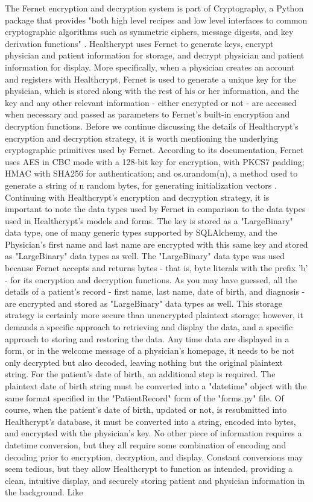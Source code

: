 \documentclass[letterpaper, 10pt,DIV=13]{scrartcl}
\begin{document}
\begin{multicols}{2}
\begin{spacing}{1.25}
The Fernet encryption and decryption system is part of Cryptography, a Python package that provides "both high level recipes and low level interfaces to common cryptographic algorithms such as symmetric ciphers, message digests, and key derivation functions" \cite{Cryptography-Docs}. Healthcrypt uses Fernet to generate keys, encrypt physician and patient information for storage, and decrypt physician and patient information for display. More specifically, when a physician creates an account and registers with Healthcrypt, Fernet is used to generate a unique key for the physician, which is stored along with the rest of his or her information, and the key and any other relevant information - either encrypted or not - are accessed when necessary and passed as parameters to Fernet's built-in encryption and decryption functions. Before we continue discussing the details of Healthcrypt's encryption and decryption strategy, it is worth mentioning the underlying cryptographic primitives used by Fernet. According to its documentation, Fernet uses AES in CBC mode with a 128-bit key for encryption, with PKCS7 padding; HMAC with SHA256 for authentication; and os.urandom(n), a method used to generate a string of n random bytes, for generating initialization vectors \cite{Cryptography-Fernet-Docs}. Continuing with Healthcrypt's encryption and decryption strategy, it is important to note the data types used by Fernet in comparison to the data types used in Healthcrypt's models and forms. The key is stored as a "LargeBinary" data type, one of many generic types supported by SQLAlchemy, and the Physician's first name and last name are encrypted with this same key and stored as "LargeBinary" data types as well. The "LargeBinary" data type was used because Fernet accepts and returns bytes - that is, byte literals with the prefix 'b' - for its encryption and decryption functions. As you may have guessed, all the details of a patient's record - first name, last name, date of birth, and diagnosis - are encrypted and stored as "LargeBinary" data types as well. This storage strategy is certainly more secure than unencrypted plaintext storage; however, it demands a specific approach to retrieving and display the data, and a specific approach to storing and restoring the data. Any time data are displayed in a form, or in the welcome message of a physician's homepage, it needs to be not only decrypted but also decoded, leaving nothing but the original plaintext string. For the patient's date of birth, an additional step is required. The plaintext date of birth string must be converted into a "datetime" object with the same format specified in the "PatientRecord" form of the "forms.py" file. Of course, when the patient's date of birth, updated or not, is resubmitted into Healthcrypt's database, it must be converted into a string, encoded into bytes, and encrypted with the physician's key. No other piece of information requires a datetime conversion, but they all require some combination of encoding and decoding prior to encryption, decryption, and display. Constant conversions may seem tedious, but they allow Healthcrypt to function as intended, providing a clean, intuitive display, and securely storing patient and physician information in the background. Like 
\end{spacing}
\end{multicols}
\end{document}
